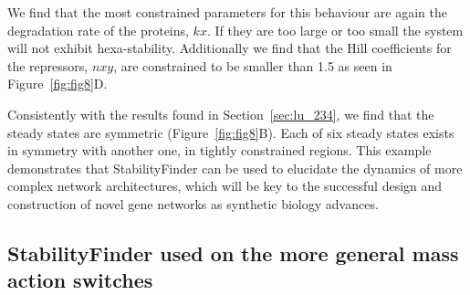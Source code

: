 We find that the most constrained parameters for this behaviour are again the degradation rate of the proteins, $kx$. If they are too large or too small the system will not exhibit hexa-stability. Additionally we find that the Hill coefficients for the repressors, $nxy$, are constrained to be smaller than 1.5 as seen in Figure~\ref{fig:fig8}D. 

Consistently with the results found in Section~\ref{sec:lu_234}, we find that the steady states are symmetric (Figure~\ref{fig:fig8}B). Each of six steady states exists in symmetry with another one, in tightly constrained regions. This example demonstrates that StabilityFinder can be used to elucidate the dynamics of more complex network architectures, which will be key to the successful design and construction of novel gene networks as synthetic biology advances.


\clearpage
\subsection{StabilityFinder used on the more general mass action switches}
\label{sec:ma_sw}						

